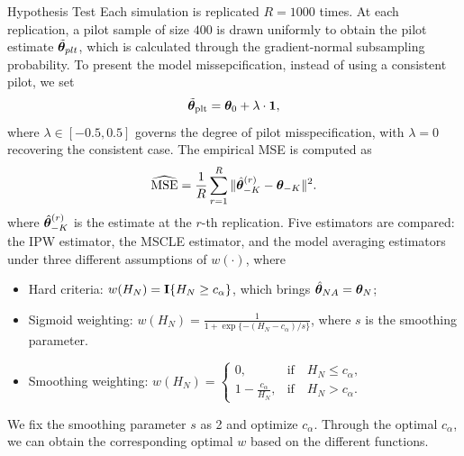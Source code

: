 \documentclass[12pt,hidelinks]{article}
\begin{document}
\begin{section}{Hypothesis Test}
Each simulation is replicated $R = 1000$ times. At each replication, a pilot sample of size $400$ is drawn uniformly to obtain the pilot estimate $\tilde{\bm{\theta}}_{plt}$, which is calculated through the gradient-normal subsampling probability. 
To present the model missepcification, instead of using a consistent pilot, we set
\begin{equation*}
    \tilde{\bm{\theta}}_{\text{plt}} = \bm{\theta}_0 + \lambda \cdot \mathbf{1},
\end{equation*}
where $\lambda \in [-0.5, 0.5]$ governs the degree of pilot misspecification, 
with $\lambda = 0$ recovering the consistent case. 
The empirical MSE is computed as
\begin{equation*}
    \widehat{\text{MSE}} = \frac{1}{R}\sum_{r=1}^{R} 
    \|{\hat{\bm{\theta}}}_{-K}^{(r)} - \bm{\theta}_{-K}\|^2.
\end{equation*}
where ${\hat{\bm{\theta}}}_{-K}^{(r)}$ is the estimate at the $r$-th replication.
Five estimators are compared: the IPW estimator, the MSCLE estimator, and the model averaging estimators under three different assumptions of $w(\cdot)$, where 
\begin{itemize}
    \item Hard criteria: $w(H_N) = \mathbf{I}\{H_N \geq c_\alpha\}$, which brings ${\hat{\bm{\theta}}}_{NA} = \bm{\theta}_{N}$;
    \item Sigmoid weighting: $w(H_N) = \frac{1}{1+\exp\{-(H_N-c_\alpha)/s\}}$, where $s$ is the smoothing parameter.
    \item Smoothing weighting: $w(H_N) = \begin{cases}
 0, & \text{if} \quad H_N \leq c_\alpha, \\
1-\frac{c_\alpha}{H_N}, & \text{if} \quad H_N > c_\alpha.
\end{cases}$
\end{itemize}
We fix the smoothing parameter $s$
as 2 and optimize $c_\alpha$. Through the optimal $c_\alpha$, we can obtain the corresponding optimal $w$ based on the different functions.


\end{section}
\end{document}
